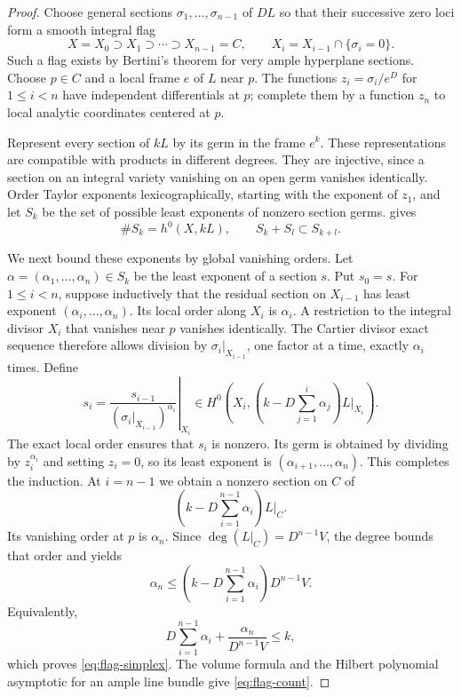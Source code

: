 \begin{proof}
Choose general sections $\sigma_1,\ldots,\sigma_{n-1}$ of $DL$ so that their successive zero loci form a smooth integral flag
\[
 X=X_0\supset X_1\supset\cdots\supset X_{n-1}=C,
 \qquad
 X_i=X_{i-1}\cap\{\sigma_i=0\}.
\]
Such a flag exists by Bertini's theorem for very ample hyperplane sections. Choose $p\in C$ and a local frame $e$ of $L$ near $p$. The functions $z_i=\sigma_i/e^D$ for $1\leq i<n$ have independent differentials at $p$; complete them by a function $z_n$ to local analytic coordinates centered at $p$.

Represent every section of $kL$ by its germ in the frame $e^k$. These representations are compatible with products in different degrees. They are injective, since a section on an integral variety vanishing on an open germ vanishes identically. Order Taylor exponents lexicographically, starting with the exponent of $z_1$, and let $S_k$ be the set of possible least exponents of nonzero section germs.  gives
\[
 \#S_k=h^0(X,kL),\qquad S_k+S_l\subset S_{k+l}.
\]

We next bound these exponents by global vanishing orders. Let $\alpha=(\alpha_1,\ldots,\alpha_n)\in S_k$ be the least exponent of a section $s$. Put $s_0=s$. For $1\leq i<n$, suppose inductively that the residual section on $X_{i-1}$ has least exponent $(\alpha_i,\ldots,\alpha_n)$. Its local order along $X_i$ is $\alpha_i$. A restriction to the integral divisor $X_i$ that vanishes near $p$ vanishes identically. The Cartier divisor exact sequence therefore allows division by $\sigma_i|_{X_{i-1}}$, one factor at a time, exactly $\alpha_i$ times. Define
\[
 s_i=
 \left.
 \frac{s_{i-1}}{(\sigma_i|_{X_{i-1}})^{\alpha_i}}
 \right|_{X_i}
 \in H^0\left(X_i,
       \left(k-D\sum_{j=1}^i\alpha_j\right)L|_{X_i}\right).
\]
The exact local order ensures that $s_i$ is nonzero. Its germ is obtained by dividing by $z_i^{\alpha_i}$ and setting $z_i=0$, so its least exponent is $(\alpha_{i+1},\ldots,\alpha_n)$. This completes the induction. At $i=n-1$ we obtain a nonzero section on $C$ of
\[
 \left(k-D\sum_{i=1}^{n-1}\alpha_i\right)L|_C.
\]
Its vanishing order at $p$ is $\alpha_n$. Since $\deg(L|_C)=D^{n-1}V$, the degree bounds that order and yields
\[
 \alpha_n\leq
 \left(k-D\sum_{i=1}^{n-1}\alpha_i\right)D^{n-1}V.
\]
Equivalently,
\[
 D\sum_{i=1}^{n-1}\alpha_i+
 \frac{\alpha_n}{D^{n-1}V}\leq k,
\]
which proves \eqref{eq:flag-simplex}. The volume formula and the Hilbert polynomial asymptotic for an ample line bundle give \eqref{eq:flag-count}.


\end{proof}
